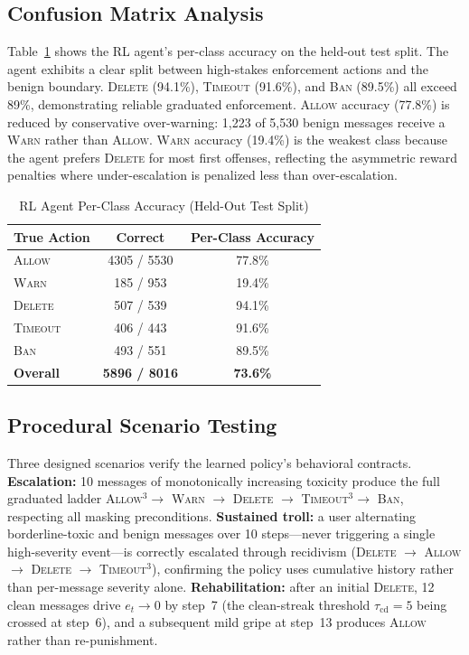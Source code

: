 \documentclass[journal]{IEEEtran}
\begin{document}
\subsection{Confusion Matrix Analysis}

Table~\ref{tab:confusion} shows the RL agent's per-class accuracy on the held-out
test split. The agent exhibits a clear split between high-stakes enforcement actions and
the benign boundary. \textsc{Delete} (94.1\%), \textsc{Timeout} (91.6\%), and \textsc{Ban}
(89.5\%) all exceed 89\%, demonstrating reliable graduated enforcement. \textsc{Allow}
accuracy (77.8\%) is reduced by conservative over-warning: 1,223 of 5,530 benign
messages receive a \textsc{Warn} rather than \textsc{Allow}. \textsc{Warn} accuracy
(19.4\%) is the weakest class because the agent prefers \textsc{Delete} for most first
offenses, reflecting the asymmetric reward penalties where under-escalation is penalized
less than over-escalation.

\begin{table}[!t]
  \renewcommand{\arraystretch}{1.3}
  \caption{RL Agent Per-Class Accuracy (Held-Out Test Split)}
  \label{tab:confusion}
  \centering
  \begin{tabular}{lcc}
    \toprule
    True Action & Correct & Per-Class Accuracy \\
    \midrule
    \textsc{Allow}   & 4305 / 5530 & 77.8\% \\
    \textsc{Warn}    &  185 /  953 & 19.4\% \\
    \textsc{Delete}  &  507 /  539 & 94.1\% \\
    \textsc{Timeout} &  406 /  443 & 91.6\% \\
    \textsc{Ban}     &  493 /  551 & 89.5\% \\
    \midrule
    \textbf{Overall} & \textbf{5896 / 8016} & \textbf{73.6\%} \\
    \bottomrule
  \end{tabular}
\end{table}

\subsection{Procedural Scenario Testing}

Three designed scenarios verify the learned policy's behavioral contracts.
\textbf{Escalation:} 10 messages of monotonically increasing toxicity produce the full
graduated ladder \textsc{Allow}$^3 \to$ \textsc{Warn} $\to$ \textsc{Delete} $\to$
\textsc{Timeout}$^3 \to$ \textsc{Ban}, respecting all masking preconditions.
\textbf{Sustained troll:} a user alternating borderline-toxic and benign messages over
10 steps---never triggering a single high-severity event---is correctly escalated through
recidivism (\textsc{Delete} $\to$ \textsc{Allow} $\to$ \textsc{Delete} $\to$
\textsc{Timeout}$^3$), confirming the policy uses cumulative history rather than
per-message severity alone. \textbf{Rehabilitation:} after an initial \textsc{Delete},
12 clean messages drive $e_t \to 0$ by step~7 (the clean-streak threshold
$\tau_{\text{cd}} = 5$ being crossed at step~6), and a subsequent mild gripe at step~13
produces \textsc{Allow} rather than re-punishment.
\end{document}
